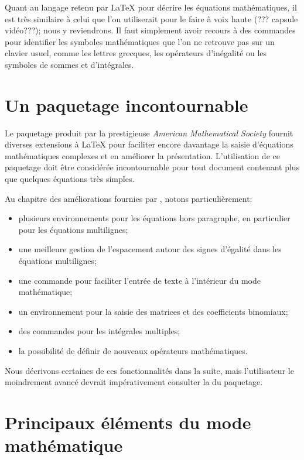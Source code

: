 Quant au langage retenu par {\LaTeX} pour décrire les équations
mathématiques, il est très similaire à celui que l'on utiliserait pour
le faire à voix haute (??? capsule vidéo???); nous y reviendrons. Il faut simplement avoir
recours à des commandes pour identifier les symboles mathématiques que
l'on ne retrouve pas sur un clavier usuel, comme les lettres grecques,
les opérateurs d'inégalité ou les symboles de sommes et d'intégrales.


\section{Un paquetage incontournable}
\label{sec:math:amsmath}

Le paquetage  \citep{amsmath} produit par la prestigieuse
\emph{American Mathematical Society} fournit diverses extensions à
{\LaTeX} pour faciliter encore davantage la saisie d'équations
mathématiques complexes et en améliorer la présentation. L'utilisation
de ce paquetage doit être considérée incontournable pour tout document
contenant plus que quelques équations très simples.

Au chapitre des améliorations fournies par , notons
particulièrement:
\begin{itemize}
\item plusieurs environnements pour les équations hors paragraphe, en
  particulier pour les équations multilignes;
\item une meilleure gestion de l'espacement autour des signes
  d'égalité dans les équations multilignes;
\item une commande pour faciliter l'entrée de texte à l'intérieur du
  mode mathématique;
\item un environnement pour la saisie des matrices et des coefficients
  binomiaux;
\item des commandes pour les intégrales multiples;
\item la possibilité de définir de nouveaux opérateurs mathématiques.
\end{itemize}
Nous décrivons certaines de ces fonctionnalités dans la suite, mais
l'utilisateur le moindrement avancé devrait impérativement consulter
la %
du paquetage.


\section{Principaux éléments du mode mathématique}
\label{sec:math:bases}

